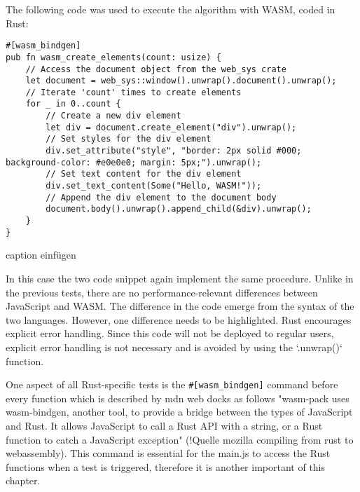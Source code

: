 The following code was used to execute the algorithm with WASM, coded in Rust:
\begin{verbatim}
#[wasm_bindgen]
pub fn wasm_create_elements(count: usize) {
    // Access the document object from the web_sys crate
    let document = web_sys::window().unwrap().document().unwrap();
    // Iterate 'count' times to create elements
    for _ in 0..count {
        // Create a new div element
        let div = document.create_element("div").unwrap();
        // Set styles for the div element
        div.set_attribute("style", "border: 2px solid #000; background-color: #e0e0e0; margin: 5px;").unwrap();
        // Set text content for the div element
        div.set_text_content(Some("Hello, WASM!"));
        // Append the div element to the document body
        document.body().unwrap().append_child(&div).unwrap();
    }
}
\end{verbatim}
caption einfügen

In this case the two code snippet again implement the same procedure. Unlike in the previous tests, there are no performance-relevant differences between JavaScript and WASM. The difference in the code emerge from the syntax of the two languages. However, one difference needs to be highlighted. Rust encourages explicit error handling. Since this code will not be deployed to regular users, explicit error handling is not necessary and is avoided by using the `.unwrap()` function.

One aspect of all Rust-specific tests is the \texttt{\#[wasm\_bindgen]} command before every function which is described by mdn web docks as follows "wasm-pack uses wasm-bindgen, another tool, to provide a bridge between the types of JavaScript and Rust. It allows JavaScript to call a Rust API with a string, or a Rust function to catch a JavaScript exception" (!Quelle mozilla compiling from rust to webassembly). This command is essential for the main.js to access the Rust functions when a test is triggered, therefore it is another important of this chapter. 